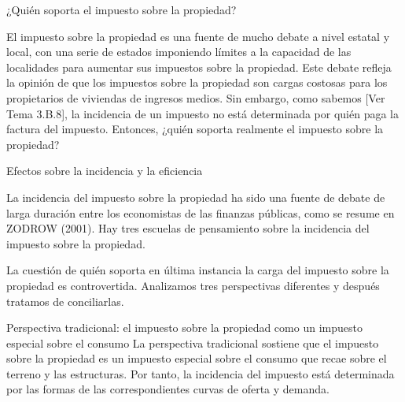 \documentclass[10pt,a4paper]{article}
\newcommand{\authorfont}[1]{{\fontfamily{EBGaramond-TLF}\selectfont #1}}
\begin{document}
¿Quién soporta el impuesto sobre la propiedad?

El impuesto sobre la propiedad es una fuente de mucho debate a nivel estatal y local, con una serie de estados imponiendo límites a la capacidad de las localidades para aumentar sus impuestos sobre la propiedad. Este debate refleja la opinión de que los impuestos sobre la propiedad son cargas costosas para los propietarios de viviendas de ingresos medios. Sin embargo, como sabemos [\authorfont{Ver Tema 3.B.8}], la incidencia de un impuesto no está determinada por quién paga la factura del impuesto. Entonces, ¿quién soporta realmente el impuesto sobre la propiedad?










Efectos sobre la incidencia y la eficiencia

La incidencia del impuesto sobre la propiedad ha sido una fuente de debate de larga duración entre los economistas de las finanzas públicas, como se resume en ZODROW (2001). Hay tres escuelas de pensamiento sobre la incidencia del impuesto sobre la propiedad. 

La cuestión de quién soporta en última instancia la carga del impuesto sobre la propiedad es controvertida. Analizamos tres perspectivas diferentes y después tratamos de conciliarlas.

Perspectiva tradicional: el impuesto sobre la propiedad como un impuesto especial sobre el consumo 
La perspectiva tradicional sostiene que el impuesto sobre la propiedad es un impuesto especial sobre el consumo que recae sobre el terreno y las estructuras. Por tanto, la incidencia del impuesto está determinada por las formas de las correspondientes curvas de oferta y demanda.
\end{document}
